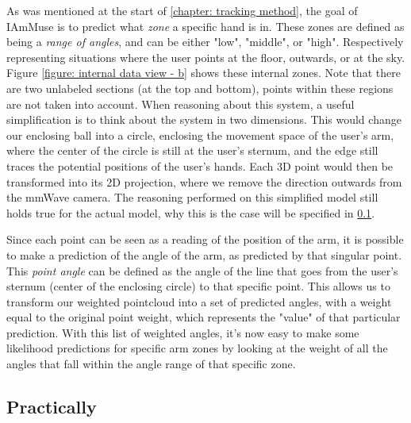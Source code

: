 As was mentioned at the start of \cref{chapter: tracking method}, the goal of IAmMuse is to predict what \textit{zone} a specific hand is in.
These zones are defined as being a \textit{range of angles}, and can be either "low", "middle", or "high".
Respectively representing situations where the user points at the floor, outwards, or at the sky.
Figure \ref{figure: internal data view - b} shows these internal zones. 
Note that there are two unlabeled sections (at the top and bottom), points within these regions are not taken into account.
When reasoning about this system, a useful simplification is to think about the system in two dimensions.
This would change our enclosing ball into a circle, enclosing the movement space of the user's arm, where the center of the circle is still at the user's sternum, and the edge still traces the potential positions of the user's hands. 
Each 3D point would then be transformed into its 2D projection, where we remove the direction outwards from the mmWave camera.
The reasoning performed on this simplified model still holds true for the actual model, why this is the case will be specified in \cref{sub-section: tracking method - data interpretation - practically}.


Since each point can be seen as a reading of the position of the arm, it is possible to make a prediction of the angle of the arm, as predicted by that singular point.
This \textit{point angle} can be defined as the angle of the line that goes from the user's sternum (center of the enclosing circle) to that specific point.
This allows us to transform our weighted pointcloud into a set of predicted angles, with a weight equal to the original point weight, which represents the "value" of that particular prediction.
With this list of weighted angles, it's now easy to make some likelihood predictions for specific arm zones by looking at the weight of all the angles that fall within the angle range of that specific zone.


\subsection{Practically}
\label{sub-section: tracking method - data interpretation - practically}

